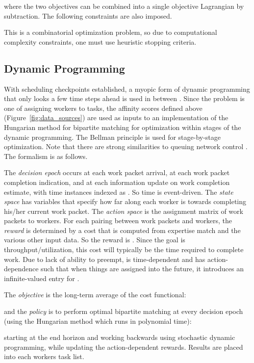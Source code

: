 \documentclass[10pt,journal,cspaper,compsoc]{IEEEtran}
\begin{document}
where the two objectives can be combined into a single objective Lagrangian by subtraction.
The following constraints are also imposed.


This is a combinatorial optimization problem, so due to computational complexity constraints, one must 
use heuristic stopping criteria.

\subsection{Dynamic Programming}
With scheduling checkpoints established, a myopic form of dynamic programming that only looks a few time
steps ahead is used in between \cite{Bellman1957}.  Since the problem is one of assigning workers to
tasks, the affinity scores defined above (Figure~\ref{fig:data_sources}) are used as inputs to 
an implementation of the Hungarian method for bipartite matching \cite{Kuhn1955} for optimization 
within stages of the dynamic programming.  The Bellman principle is used for stage-by-stage optimization.
Note that there are strong similarities to queuing network control \cite{TehraniZ2010}.
The formalism is as follows.

The \emph{decision epoch} occurs at each work packet arrival, at each work packet completion 
indication, and at each information update on work completion estimate, with time instances indexed 
as . So time is event-driven.  The \emph{state space} has variables that specify 
how far along each worker is towards completing his/her current work packet.  The \emph{action space}
is the assignment matrix  of work packets to workers.  For each pairing between work packets and workers, 
the \emph{reward} is determined by a cost  that is computed from expertise match and the various 
other input data.  So the reward is .  Since the goal is 
throughput/utilization, this cost will typically be the time required to complete work.  Due to lack of 
ability to preempt,  is time-dependent and has action-dependence such that when things are assigned 
into the future, it introduces an infinite-valued entry for .

The \emph{objective} is the long-term average of the cost functional:

and the \emph{policy} is to perform optimal bipartite matching at every decision epoch (using the Hungarian method which runs 
in polynomial time): 

starting at the end horizon  and working backwards using stochastic dynamic programming, while updating the action-dependent rewards.  
Results are placed into each workers task list.  
\end{document}
